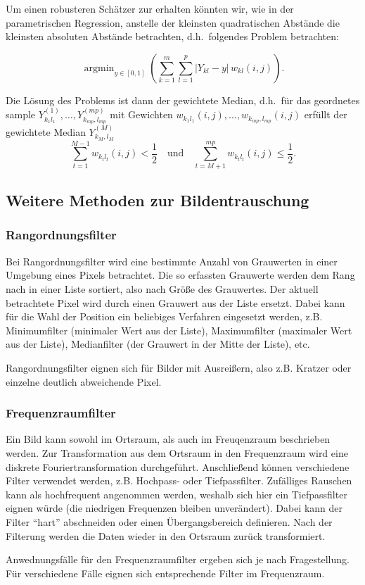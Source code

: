 \documentclass[10pt,]{article}
\DeclareMathOperator*{\argmin}{argmin}
\begin{document}
Um einen robusteren Schätzer zur erhalten könnten wir, wie in der
parametrischen Regression, anstelle der kleinsten quadratischen Abstände
die kleinsten absoluten Abstände betrachten, d.h.~folgendes Problem
betrachten:

\[
\argmin_{y \in [0,1]} \left( \sum_{k=1}^m \sum_{l=1}^p | Y_{kl} - y | \, w_{kl}(i,j) \right).
\]

Die Lösung des Problems ist dann der gewichtete Median, d.h.~für das
geordnetes sample \(Y^{(1)}_{k_1l_1}, \ldots, Y^{(mp)}_{k_{mp},l_{mp}}\)
mit Gewichten \(w_{k_1l_1}(i,j), \ldots, w_{k_{mp},l_{mp}}(i,j)\)
erfüllt der gewichtete Median \(Y^{(M)}_{k_{M},l_{M}}\) \[
\sum_{t=1}^{M-1} w_{k_tl_t}(i,j) < \frac{1}{2} \quad \text{und} \quad \sum_{t=M+1}^{mp} w_{k_tl_t}(i,j) \leq \frac{1}{2}.
\]

\subsection{Weitere Methoden zur
Bildentrauschung}\label{weitere-methoden-zur-bildentrauschung}

\subsubsection{Rangordnungsfilter}\label{rangordnungsfilter}

Bei Rangordnungsfilter wird eine bestimmte Anzahl von Grauwerten in
einer Umgebung eines Pixels betrachtet. Die so erfassten Grauwerte
werden dem Rang nach in einer Liste sortiert, also nach Größe des
Grauwertes. Der aktuell betrachtete Pixel wird durch einen Grauwert aus
der Liste ersetzt. Dabei kann für die Wahl der Position ein beliebiges
Verfahren eingesetzt werden, z.B. Minimumfilter (minimaler Wert aus der
Liste), Maximumfilter (maximaler Wert aus der Liste), Medianfilter (der
Grauwert in der Mitte der Liste), etc.

Rangordnungsfilter eignen sich für Bilder mit Ausreißern, also z.B.
Kratzer oder einzelne deutlich abweichende Pixel.

\subsubsection{Frequenzraumfilter}\label{frequenzraumfilter}

Ein Bild kann sowohl im Ortsraum, als auch im Freuqenzraum beschrieben
werden. Zur Transformation aus dem Ortsraum in den Frequenzraum wird
eine diskrete Fouriertransformation durchgeführt. Anschließend können
verschiedene Filter verwendet werden, z.B. Hochpass- oder
Tiefpassfilter. Zufälliges Rauschen kann als hochfrequent angenommen
werden, weshalb sich hier ein Tiefpassfilter eignen würde (die niedrigen
Frequenzen bleiben unverändert). Dabei kann der Filter ``hart''
abschneiden oder einen Übergangsbereich definieren. Nach der Filterung
werden die Daten wieder in den Ortsraum zurück transformiert.

Anwednungsfälle für den Frequenzraumfilter ergeben sich je nach
Fragestellung. Für verschiedene Fälle eignen sich entsprechende Filter
im Frequenzraum.
\end{document}
